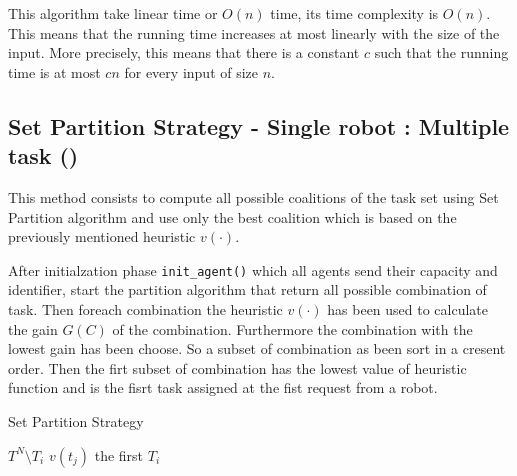 


This algorithm take linear time or $O(n)$ time, its time complexity is $O(n)$.
This means that the running time increases at most linearly with the size of the input.
More precisely, this means that there is a constant $c$ such that the running time is 
at most $cn$ for every input of size $n$.

\subsection{Set Partition Strategy - Single robot : Multiple task (\sps)}

This method consists to compute all possible coalitions of the task set 
using Set Partition algorithm \cite{partition} and use only 
the best coalition which is based on the previously mentioned heuristic $v(\cdot)$.

After initialzation phase \texttt{init\_agent()} which all agents send their capacity and identifier,
start the partition algorithm \cite{partition} that return all possible combination 
of task.
Then foreach combination the heuristic $v(\cdot)$ has been used to calculate the gain $G(C)$ of the 
combination. Furthermore the combination with the lowest gain has been choose.
So a subset of combination as been sort in a cresent order. 
Then the firt subset of combination has the lowest value of heuristic function and 
is the fisrt task assigned at the fist request from a robot.

\begin{algorithm}
  \caption{Set Partition Strategy} \label{SP}
  \begin{algorithmic}[1]
  \State {}
  $T^N \setminus T_i$
  \EndIf
      $v(t_j)$ 
    \EndFor
  \EndFor
   the first $T_i$
  \EndProcedure
  \end{algorithmic}
\end{algorithm}

